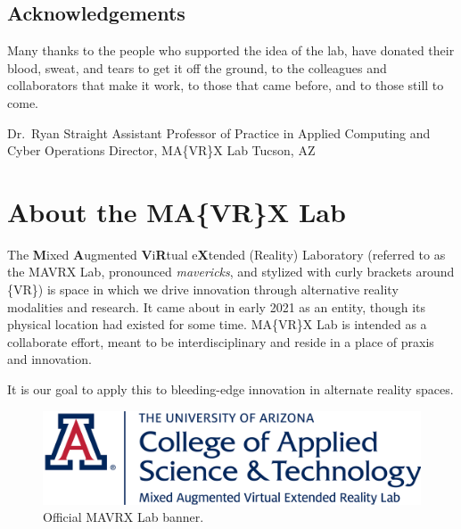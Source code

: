 \documentclass[]{tufte-book}
\begin{document}
\hypertarget{acknowledgements}{%
\section*{Acknowledgements}\label{acknowledgements}}

Many thanks to the people who supported the idea of the lab, have donated their blood, sweat, and tears to get it off the ground, to the colleagues and collaborators that make it work, to those that came before, and to those still to come.

Dr.~Ryan Straight\newline
Assistant Professor of Practice in Applied Computing and Cyber Operations\newline
Director, MA\{VR\}X Lab\newline
Tucson, AZ

\hypertarget{about-the-mavrx-lab}{%
\chapter*{About the MA\{VR\}X Lab}\label{about-the-mavrx-lab}}

The \textbf{M}ixed \textbf{A}ugmented \textbf{V}i\textbf{R}tual e\textbf{X}tended (Reality) Laboratory (referred to as the MAVRX Lab, pronounced \emph{mavericks}, and stylized with curly brackets around \{VR\}) is space in which we drive innovation through alternative reality modalities and research. It came about in early 2021 as an entity, though its physical location had existed for some time. MA\{VR\}X Lab is intended as a collaborate effort, meant to be interdisciplinary and reside in a place of praxis and innovation.

It is our goal to apply this to bleeding-edge innovation in alternate reality spaces.

\begin{figure}
\includegraphics[width=1\linewidth]{images/CAST_Mixed-Augmented-Virtual-Extended-Reality-Lab_SCRIPT_TEMPLATE_2018_PRIMARY} \caption[Official MAVRX Lab banner]{Official MAVRX Lab banner.}\label{fig:banner}
\end{figure}
\end{document}
